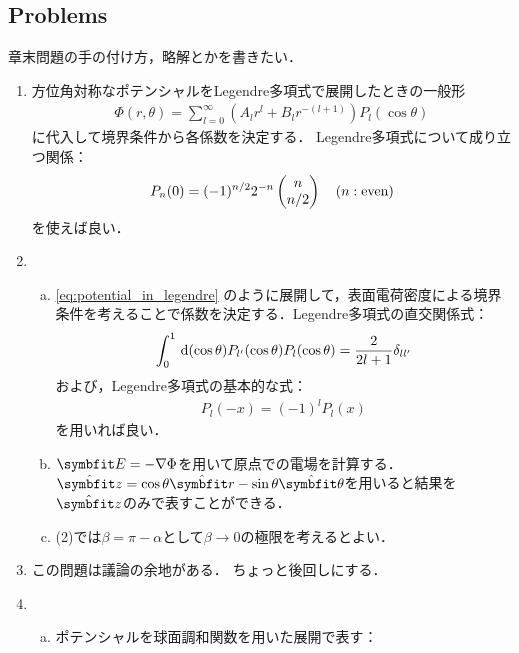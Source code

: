 \subsection{Problems}
章末問題の手の付け方，略解とかを書きたい．
\begin{enumerate}[label=\fbox{\textbf{\thesection.\arabic*}}]
  \item 方位角対称なポテンシャルをLegendre多項式で展開したときの一般形
    \begin{gather}
      \label{eq:potential_in_legendre}
      \Phi(r, \theta) = \sum_{l=0}^\infty (A_l r^l + B_l r^{-(l+1)})P_l(\cos\theta)
    \end{gather}
    に代入して境界条件から各係数を決定する．
    Legendre多項式について成り立つ関係：
    \begin{gather}
      P_n(0) = (-1)^{n/2} 2^{-n} \left(\begin{matrix}n\\n/2\end{matrix}\right) \hspace{1em} (n : \text{even})
    \end{gather}
    を使えば良い．
  \item 
    \begin{enumerate}[(a)]  
      \item \eqref{eq:potential_in_legendre}
        のように展開して，表面電荷密度による境界条件を考えることで係数を決定する．Legendre多項式の直交関係式：
        \begin{gather}
          \int_0^1 \dl{(\cos\theta)} P_{l'}(\cos\theta) P_l(\cos\theta) = \frac{2}{2l+1} \delta_{ll'}
        \end{gather}
        および，Legendre多項式の基本的な式：
        \begin{gather}
        P_l(-x) = (-1)^l P_l(x)
        \end{gather}
        を用いれば良い．
      \item $\bs{E} = - \gr \Phi$を用いて原点での電場を計算する．$\hat{\bs{z}} = \cos\theta\hat{\bs{r}} - \sin\theta \hat{\bs{\theta}}$を用いると結果を$\hat{\bs{z}}$のみで表すことができる．
      \item (2)では$\beta = \pi - \alpha$として$\beta \to 0$の極限を考えるとよい．
  \end{enumerate}
  \item この問題は議論の余地がある．
    ちょっと後回しにする．
  \item
    \begin{enumerate}[(a)]  
      \item  
    ポテンシャルを球面調和関数を用いた展開で表す：


\end{enumerate}
\end{enumerate}

